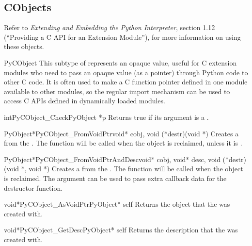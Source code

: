 \documentclass{manual}
\begin{document}
\subsection{CObjects \label{cObjects}}

Refer to \emph{Extending and Embedding the Python Interpreter},
section 1.12 (``Providing a C API for an Extension Module''), for more 
information on using these objects.


\begin{ctypedesc}{PyCObject}
This subtype of  represents an opaque value, useful for
C extension modules who need to pass an opaque value (as a
 pointer) through Python code to other C code.  It is
often used to make a C function pointer defined in one module
available to other modules, so the regular import mechanism can be
used to access C APIs defined in dynamically loaded modules.
\end{ctypedesc}

\begin{cfuncdesc}{int}{PyCObject_Check}{PyObject *p}
Returns true if its argument is a .
\end{cfuncdesc}

\begin{cfuncdesc}{PyObject*}{PyCObject_FromVoidPtr}{void* cobj, 
	void (*destr)(void *)}
Creates a  from the .  The
 function will be called when the object is reclaimed, unless
it is \NULL.
\end{cfuncdesc}

\begin{cfuncdesc}{PyObject*}{PyCObject_FromVoidPtrAndDesc}{void* cobj,
	void* desc, void (*destr)(void *, void *) }
Creates a  from the .  The
 function will be called when the object is reclaimed.  The
 argument can be used to pass extra callback data for the
destructor function.
\end{cfuncdesc}

\begin{cfuncdesc}{void*}{PyCObject_AsVoidPtr}{PyObject* self}
Returns the object  that the
  was created with.
\end{cfuncdesc}

\begin{cfuncdesc}{void*}{PyCObject_GetDesc}{PyObject* self}
Returns the description  that the
  was created with.
\end{cfuncdesc}
\end{document}
